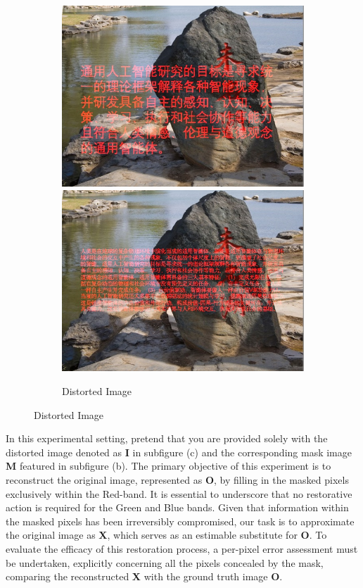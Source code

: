 \documentclass[11pt]{article}
\begin{document}
\begin{figure}[ht!]
\begin{subfigure}[]{0.333\linewidth}
        \includegraphics[width=\linewidth]{fig/imposed_stone_big.jpg}
        \includegraphics[width=\linewidth]{fig/imposed_stone_small.jpg}
        \caption{Distorted Image}
    \end{subfigure}%
\end{figure}


 In this experimental setting, pretend that you are provided solely with the distorted image denoted as \textbf{I} in subfigure (c) and the corresponding mask image \textbf{M} featured in subfigure (b). The primary objective of this experiment is to reconstruct the original image, represented as \textbf{O}, by filling in the masked pixels exclusively within the Red-band. It is essential to underscore that no restorative action is required for the Green and Blue bands. Given that information within the masked pixels has been irreversibly compromised, our task is to approximate the original image as \textbf{X}, which serves as an estimable substitute for \textbf{O}. To evaluate the efficacy of this restoration process, a per-pixel error assessment must be undertaken, explicitly concerning all the pixels concealed by the mask, comparing the reconstructed \textbf{X} with the ground truth image \textbf{O}.
\end{document}
